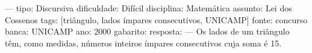---
tipo: Discursiva
dificuldade: Difícil
disciplina: Matemática
assunto: Lei dos Cossenos
tags: [triângulo, lados ímpares consecutivos, UNICAMP]
fonte: concurso
banca: UNICAMP
ano: 2000
gabarito:
resposta:
---
\question
Os lados de um triângulo têm, como medidas, números inteiros ímpares consecutivos cuja soma é 15.
